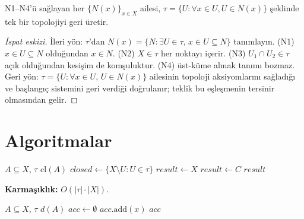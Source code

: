\begin{theorem}
\label{thm:neighborhood_round_trip}
N1--N4'ü sağlayan her $\{N(x)\}_{x \in X}$ ailesi,
$\tau = \{U : \forall x \in U, U \in N(x)\}$ şeklinde tek bir topolojiyi geri üretir.
\end{theorem}

\begin{proof}[İspat eskizi]
İleri yön: $\tau$'dan $N(x)=\{N : \exists U\in\tau,\, x\in U\subseteq N\}$ tanımlayın.
(N1) $x\in U\subseteq N$ olduğundan $x\in N$. (N2) $X\in\tau$ her noktayı içerir.
(N3) $U_1\cap U_2\in\tau$ açık olduğundan kesişim de komşuluktur. (N4) üst-küme almak
tanımı bozmaz. Geri yön: $\tau=\{U : \forall x\in U,\, U\in N(x)\}$ ailesinin topoloji
aksiyomlarını sağladığı ve başlangıç sistemini geri verdiği doğrulanır; teklik bu
eşleşmenin tersinir olmasından gelir.
\end{proof}

\section{Algoritmalar}

\begin{algorithm}
\caption{Sonlu Kapanış Hesabı}
\begin{algorithmic}[1]
\Require $A \subseteq X$, $\tau$
\Ensure $\mathrm{cl}(A)$
\State $\textit{closed} \leftarrow \{X \setminus U : U \in \tau\}$
\State $\textit{result} \leftarrow X$
        \State $\textit{result} \leftarrow C$
    \EndIf
\EndFor
\Return $\textit{result}$
\end{algorithmic}
\end{algorithm}

\noindent\textbf{Karmaşıklık:} $O(|\tau| \cdot |X|)$.

\begin{algorithm}
\caption{Türev Kümesi Hesabı}
\begin{algorithmic}[1]
\Require $A \subseteq X$, $\tau$
\Ensure $d(A)$
\State $\textit{acc} \leftarrow \emptyset$
        \State $\textit{acc}.\text{add}(x)$
    \EndIf
\EndFor
\Return $\textit{acc}$
\end{algorithmic}
\end{algorithm}

